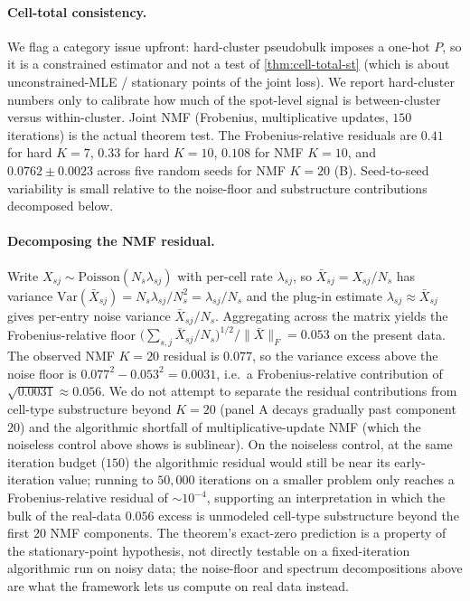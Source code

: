 \paragraph{Cell-total consistency.} We flag a category issue
upfront: hard-cluster pseudobulk imposes a one-hot $P$, so it is a
constrained estimator and not a test of \cref{thm:cell-total-st}
(which is about unconstrained-MLE / stationary points of the joint
loss). We report hard-cluster numbers only to calibrate how much of
the spot-level signal is between-cluster versus within-cluster.
Joint NMF (Frobenius, multiplicative updates, $150$ iterations) is
the actual theorem test. The Frobenius-relative residuals are
$0.41$ for hard $K = 7$, $0.33$ for hard $K = 10$, $0.108$ for NMF
$K = 10$, and $0.0762 \pm 0.0023$ across five random seeds for NMF
$K = 20$ (B). Seed-to-seed variability is small
relative to the noise-floor and substructure contributions
decomposed below.

\paragraph{Decomposing the NMF residual.} Write $X_{sj} \sim
\mathrm{Poisson}(N_s \lambda_{sj})$ with per-cell rate $\lambda_{sj}$,
so $\bar X_{sj} = X_{sj}/N_s$ has variance $\mathrm{Var}(\bar X_{sj})
= N_s \lambda_{sj}/N_s^2 = \lambda_{sj}/N_s$ and the plug-in estimate
$\lambda_{sj} \approx \bar X_{sj}$ gives per-entry noise variance
$\bar X_{sj}/N_s$. Aggregating across the matrix yields the
Frobenius-relative floor $\bigl(\sum_{s,j} \bar X_{sj}/N_s
\bigr)^{1/2} / \|\bar X\|_F = 0.053$ on the present data. The observed NMF $K =
20$ residual is $0.077$, so the variance excess above the noise
floor is $0.077^2 - 0.053^2 = 0.0031$, i.e.\ a Frobenius-relative
contribution of $\sqrt{0.0031} \approx 0.056$. We do not attempt to
separate the residual contributions from cell-type substructure
beyond $K = 20$ (panel A decays gradually past component $20$) and
the algorithmic shortfall of multiplicative-update NMF (which the
noiseless control above shows is sublinear). On the noiseless
control, at the same iteration budget ($150$) the algorithmic
residual would still be near its early-iteration value; running to
$50{,}000$ iterations on a smaller problem only reaches a
Frobenius-relative residual of $\sim 10^{-4}$, supporting an
interpretation in which the bulk of the real-data $0.056$ excess is
unmodeled cell-type substructure beyond the first $20$ NMF
components. The theorem's exact-zero prediction is a property of
the stationary-point hypothesis, not directly testable on a
fixed-iteration algorithmic run on noisy data; the noise-floor and
spectrum decompositions above are what the framework lets us
compute on real data instead.

